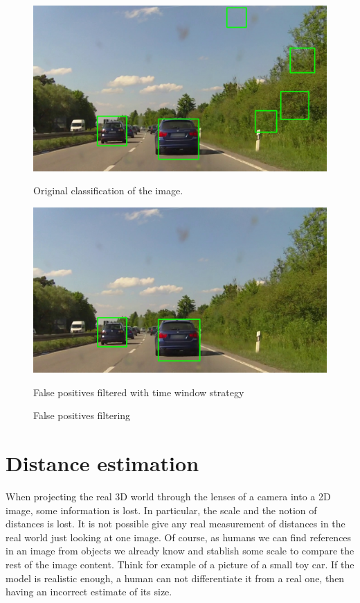 \begin{figure}    
\begin{minipage}[t]{0.45\textwidth}
\includegraphics[width=\linewidth]{img/outliers_original.jpg}
\caption{Original classification of the image.}
\end{minipage}
\begin{minipage}[t]{0.45\textwidth}
\includegraphics[width=\linewidth]{img/outliers_filtered.jpg}
\caption{False positives filtered with time window strategy}
\end{minipage}
\caption{False positives filtering}
\label{fig:distance-pictures}
\end{figure}


\section{Distance estimation} %
\label{sec:Distance-estimation}

When projecting the real 3D world through the lenses of a camera into a 2D
image, some information is lost. In particular, the scale and the notion of
distances is lost. It is not possible give any real
measurement of distances in the real world just looking at one image. 
Of course, as humans we can find references in an image from objects we already
know and stablish some scale to compare the rest of the image content. Think for
example of a picture of a small toy car. If the model is realistic 
enough, a human can not differentiate it from a real one, then having an
incorrect estimate of its size.

